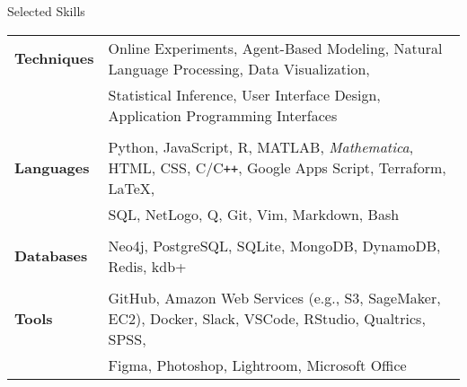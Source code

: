 \documentclass{cv} %
\begin{document}
\begin{cvSection}{Selected Skills}

\begin{tabular}{ @{} >{\bfseries}l @{\hspace{1em}} l }
Techniques &  Online Experiments, Agent-Based Modeling, Natural Language Processing, Data Visualization,
\\
& Statistical Inference, User Interface Design, Application Programming Interfaces
\\\\
Languages &  Python, JavaScript, R, MATLAB, \textit{Mathematica}, HTML, CSS, C/C\texttt{++}, Google Apps Script, Terraform, \LaTeX{},
\\
& SQL, NetLogo, Q, Git, Vim, Markdown, Bash
\\\\
Databases & Neo4j, PostgreSQL, SQLite, MongoDB, DynamoDB, Redis, kdb+
\\\\
Tools & GitHub, Amazon Web Services (e.g., S3, SageMaker, EC2), Docker, Slack, VSCode, RStudio, Qualtrics, SPSS,
\\
& Figma, Photoshop, Lightroom, Microsoft Office
\end{tabular}

\end{cvSection}
\end{document}

